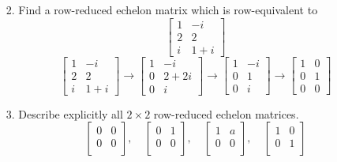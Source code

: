 \documentclass{article}
\begin{document}
\begin{enumerate}[listparindent=\parindent]
\item[2.] Find a row-reduced echelon matrix which is row-equivalent to
    \[
        \begin{bmatrix}
            1 & -i \\
            2 & 2 \\
            i & 1 + i 
        \end{bmatrix}
    \]
\[
    \begin{bmatrix}
        1 & -i \\
        2 & 2 \\
        i & 1 + i 
    \end{bmatrix}
    \rightarrow
    \begin{bmatrix}
        1 & -i \\
        0 & 2+2i \\
        0 & i 
    \end{bmatrix}
    \rightarrow
    \begin{bmatrix}
        1 & -i \\
        0 & 1 \\
        0 & i 
    \end{bmatrix}
    \rightarrow
    \boxed{
        \begin{bmatrix}
            1 & 0 \\
            0 & 1 \\
            0 & 0 
        \end{bmatrix}
    }
\]

\item[3.] Describe explicitly all \(2 \times 2\) row-reduced echelon matrices.
\[
    \boxed{
        \begin{bmatrix}
            0 & 0 \\
            0 & 0 \\
        \end{bmatrix}
        , \quad
        \begin{bmatrix}
            0 & 1 \\
            0 & 0 \\
        \end{bmatrix}
        , \quad
        \begin{bmatrix}
            1 & a \\
            0 & 0 \\
        \end{bmatrix}
        , \quad
        \begin{bmatrix}
            1 & 0 \\
            0 & 1 \\
        \end{bmatrix}
    }
\]


\end{enumerate}
\end{document}
